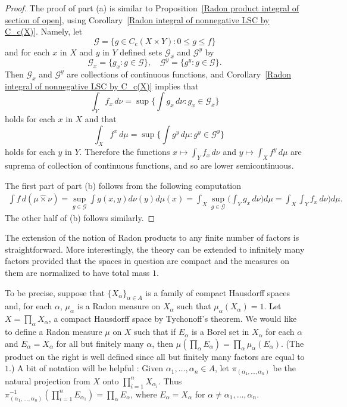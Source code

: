 \begin{proof}
The proof of part (a) is similar to Proposition~\ref{Radon product integral of section of open}, using Corollary~\ref{Radon integral of nonnegative LSC by C_c(X)}. Namely, let
\[\mathscr{G}=\{g\in C_c(X\times Y):0\leq g\leq f\}\]
and for each $x$ in $X$ and $y$ in $Y$ defined sets $\mathscr{G}_x$ and $\mathscr{G}^y$ by
\[\mathscr{G}_x=\{g_x:g\in\mathscr{G}\},\quad \mathscr{G}^y=\{g^y:g\in\mathscr{G}\}.\]
Then $\mathscr{G}_x$ and $\mathscr{G}^y$ are collections of continuous functions, and Corollary~\ref{Radon integral of nonnegative LSC by C_c(X)} implies that
\[\int_Yf_x\,d\nu=\sup\{\int g_x\,d\nu:g_x\in\mathscr{G}_x\}\]holds for each $x$ in $X$ and that
\[\quad\int_Xf^x\,d\mu=\sup\{\int g^y\,d\mu:g^y\in\mathscr{G}^y\}\]
holds for each $y$ in $Y$. Therefore the functions $x\mapsto\int_Yf_x\,d\nu$ and $y\mapsto\int_Xf^y\,d\mu$ are suprema of collection of continuous functions, and so are lower semicontinuous.\par
The first part of part (b) follows from the following computation
\begin{align*}
\int f\,d(\mu\hat{\times}\nu)=\sup_{g\in\mathscr{G}}\int g(x,y)d\nu(y)d\mu(x)=\int_X\sup_{g\in\mathscr{G}}\Big(\int_Yg_x\,d\nu\Big)d\mu=\int_X\int_Y f_x\,d\nu\Big)d\mu.
\end{align*}
The other half of (b) follows similarly.
\end{proof}
The extension of the notion of Radon products to any finite number of factors is straightforward. More interestingly, the theory can be extended to infinitely many factors provided that the spaces in question are compact and the measures on them are normalized to have total mass $1$.\par
To be precise, suppose that $\{X_\alpha\}_{\alpha\in A}$ is a family of compact Hausdorff spaces and, for each $\alpha$, $\mu_\alpha$ is a Radon measure on $X_\alpha$ such that $\mu_\alpha(X_\alpha)=1$. Let $X=\prod_{\alpha}X_\alpha$, a compact Hausdorff space by Tychonoff's theorem. We would like to define a Radon measure $\mu$ on $X$ such that if $E_\alpha$ is a Borel set in $X_\alpha$ for each $\alpha$ and $E_\alpha=X_\alpha$ for all but finitely many $\alpha$, then $\mu(\prod_{\alpha}E_\alpha)=\prod_{\alpha}\mu_\alpha(E_\alpha)$. (The product on the right is well defined since all but finitely many factors are equal to $1$.) A bit of notation will be helpful : Given $\alpha_1,\dots,\alpha_n\in A$, let $\pi_{(\alpha_1,\dots,\alpha_n)}$ be the natural projection from $X$ onto $\prod_{i=1}^{n}X_{\alpha_i}$. Thus $\pi_{(\alpha_1,\dots,\alpha_n)}^{-1}(\prod_{i=1}^{n}E_{\alpha_1})=\prod_{\alpha}E_\alpha$, where $E_\alpha=X_\alpha$ for $\alpha\neq\alpha_1,\dots,\alpha_n$.
